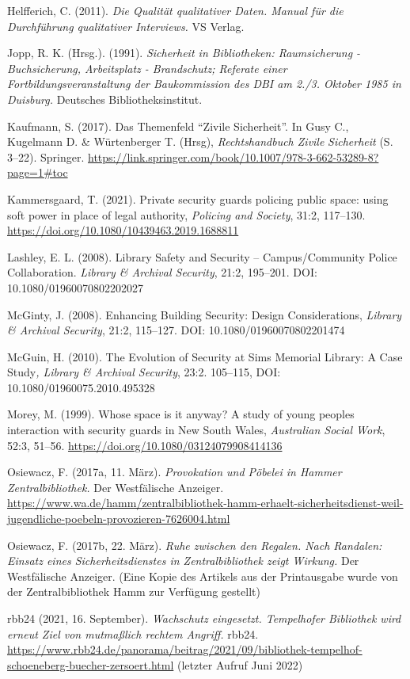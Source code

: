 \documentclass[a4paper,
fontsize=11pt,
oneside,
numbers=noperiodatend,
parskip=half-,
bibliography=totoc,
final
]{scrartcl}
\begin{document}
Helfferich, C. (2011). \emph{Die Qualität qualitativer Daten. Manual für
die Durchführung qualitativer Interviews.} VS Verlag.

Jopp, R. K. (Hrsg.). (1991). \emph{Sicherheit in Bibliotheken:
Raumsicherung - Buchsicherung, Arbeitsplatz - Brandschutz; Referate
einer Fortbildungsveranstaltung der Baukommission des DBI am 2./3.
Oktober 1985 in Duisburg.} Deutsches Bibliotheksinstitut.

Kaufmann, S. (2017). Das Themenfeld \enquote{Zivile Sicherheit}. In Gusy
C., Kugelmann D. \& Würtenberger T. (Hrsg), \emph{Rechtshandbuch Zivile}
\emph{Sicherheit} (S. 3--22). Springer.
\url{https://link.springer.com/book/10.1007/978-3-662-53289-8?page=1\#toc}

Kammersgaard, T. (2021). Private security guards policing public space:
using soft power in place of legal authority, \emph{Policing and
Society}, 31:2, 117--130.
\url{https://doi.org/10.1080/10439463.2019.1688811}

Lashley, E. L. (2008). Library Safety and Security -- Campus/Community
Police Collaboration. \emph{Library \& Archival Security}, 21:2,
195--201. DOI: 10.1080/01960070802202027

McGinty, J. (2008). Enhancing Building Security: Design Considerations,
\emph{Library \& Archival Security}, 21:2, 115--127. DOI:
10.1080/01960070802201474

McGuin, H. (2010). The Evolution of Security at Sims Memorial Library: A
Case Study\emph{, Library \& Archival Security}, 23:2. 105--115, DOI:
10.1080/01960075.2010.495328

Morey, M. (1999). Whose space is it anyway? A study of young
people\textquotesingle s interaction with security guards in New South
Wales, \emph{Australian Social Work}, 52:3, 51--56.
\url{https://doi.org/10.1080/03124079908414136}

Osiewacz, F. (2017a, 11. März). \emph{Provokation und Pöbelei in Hammer
Zentralbibliothek.} Der Westfälische Anzeiger.
\url{https://www.wa.de/hamm/zentralbibliothek-hamm-erhaelt-sicherheitsdienst-weil-jugendliche-poebeln-provozieren-7626004.html}

Osiewacz, F. (2017b, 22. März). \emph{Ruhe zwischen den Regalen. Nach
Randalen: Einsatz eines Sicherheitsdienstes in Zentralbibliothek zeigt
Wirkung.} Der Westfälische Anzeiger. (Eine Kopie des Artikels aus der
Printausgabe wurde von der Zentralbibliothek Hamm zur Verfügung
gestellt)

rbb24 (2021, 16. September). \emph{Wachschutz eingesetzt. Tempelhofer
Bibliothek wird erneut Ziel von mutmaßlich rechtem Angriff.} rbb24.
\url{https://www.rbb24.de/panorama/beitrag/2021/09/bibliothek-tempelhof-schoeneberg-buecher-zersoert.html}
(letzter Aufruf Juni 2022)
\end{document}
